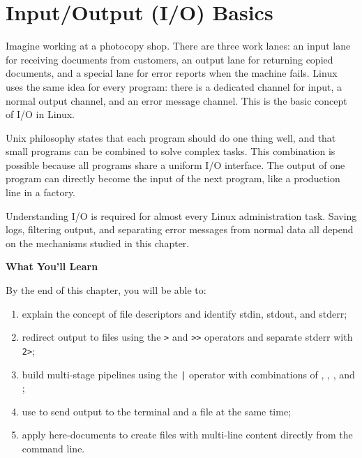 
\chapter{Input/Output (I/O) Basics}
\label{ch:basic-io}


Imagine working at a photocopy shop. There are three work lanes: an input lane for receiving documents from customers, an output lane for returning copied documents, and a special lane for error reports when the machine fails. Linux uses the same idea for every program: there is a dedicated channel for input, a normal output channel, and an error message channel. This is the basic concept of I/O in Linux.

Unix philosophy states that each program should do one thing well, and that small programs can be combined to solve complex tasks. This combination is possible because all programs share a uniform I/O interface. The output of one program can directly become the input of the next program, like a production line in a factory.

Understanding I/O is required for almost every Linux administration task. Saving logs, filtering output, and separating error messages from normal data all depend on the mechanisms studied in this chapter.

\textbf{What You'll Learn}

By the end of this chapter, you will be able to:

\begin{enumerate}
    \item explain the concept of file descriptors and identify stdin, stdout, and stderr;
    \item redirect output to files using the \texttt{>} and \texttt{>>} operators and separate stderr with \texttt{2>};
    \item build multi-stage pipelines using the \texttt{|} operator with combinations of , , , and ;
    \item use  to send output to the terminal and a file at the same time;
    \item apply here-documents to create files with multi-line content directly from the command line.
\end{enumerate}

